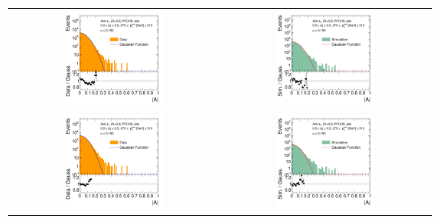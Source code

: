 \begin{figure}[!tp]   
  \centering
  \begin{tabular}{cc}
                \includegraphics[width=0.49\textwidth]{figures/AsymmHistosDataWithRatio_Eta0_pt5_alpha2_final_nominal_NoTruncation_v4.pdf} &
                \includegraphics[width=0.49\textwidth]{figures/AsymmHistosSimWithRatio_Eta0_pt5_alpha2_final_nominal_NoTruncation_v4.pdf} \\ 
                \includegraphics[width=0.49\textwidth]{figures/AsymmHistosDataWithRatio_Eta0_pt5_alpha2_final_nominal_v4.pdf} &
                \includegraphics[width=0.49\textwidth]{figures/AsymmHistosSimWithRatio_Eta0_pt5_alpha2_final_nominal_v4.pdf} \\

\end{tabular}
\end{figure}
